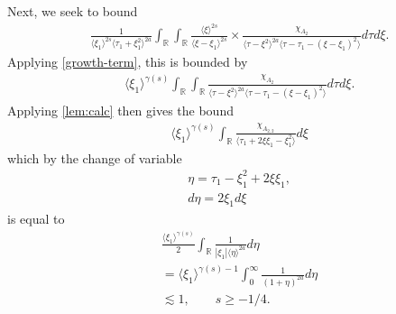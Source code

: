 \documentclass[12pt,reqno]{amsart}
\numberwithin{equation}{section}  %
\numberwithin{figure}{section}
\newcommand{\rr}{\mathbb{R}}
\theoremstyle{plain}
\theoremstyle{definition}
\theoremstyle{remark}
\begin{document}
%
%
Next, we seek to bound
\begin{equation*}
\begin{split}
  &  \frac{1}{\langle \xi_{1} \rangle ^{2s}
  \langle \tau_{1} + \xi_{1}^{2}  \rangle
  ^{2a}} \int_{\rr} \int_{\rr} \frac{\langle \xi \rangle ^{2s}}{\langle
  \xi - \xi_{1}\rangle ^{2s}}  \times \frac{\chi_{A_{2}}}{\langle
  \tau - \xi^{2} \rangle ^{2a} \langle \tau - \tau_{1} - (\xi -
  \xi_{1})^{2} \rangle } d \tau d \xi.
\end{split}
\end{equation*}
Applying \eqref{growth-term}, this is bounded by
\begin{equation*}
\begin{split}
  &  \langle \xi_{1} \rangle ^{\gamma(s)}
   \int_{\rr} \int_{\rr} \frac{\chi_{A_{2}}}{\langle
  \tau - \xi^{2} \rangle ^{2a} \langle \tau - \tau_{1} - (\xi -
  \xi_{1})^{2} \rangle } d \tau d \xi.
\end{split}
\end{equation*}
Applying \autoref{lem:calc} then gives the bound
\begin{equation*}
\begin{split}
  & \langle \xi_{1} \rangle ^{\gamma(s)} \int_{\rr} \frac{\chi_{A_{2,2}} }{\langle
  \tau_{1} + 2 \xi \xi_{1} - \xi_{1}^{2} \rangle } d \xi
\end{split}
\end{equation*}
which by the change of variable
%
%
\begin{equation*}
\begin{split}
  & \eta = \tau_{1} - \xi_{1}^{2} + 2 \xi \xi_{1},
  \\
  & d \eta = 2 \xi_{1} d \xi
\end{split}
\end{equation*}
%
%
is equal to
%
%
\begin{equation*}
\begin{split}
  & \frac{\langle \xi_{1} \rangle^{\gamma(s)}}{2}  \int_{\rr} 
  \frac{1}{| \xi_{1} |\langle \eta \rangle ^{2a} }d \eta
  \\
  & = \langle \xi_{1} \rangle ^{\gamma(s) -1} \int_{0}^{\infty} \frac{1}{(1 + \eta
  )^{2a}}d \eta
  \\
  & \lesssim 1, \qquad s \ge -1/4.
\end{split}
\end{equation*}
\end{document}
